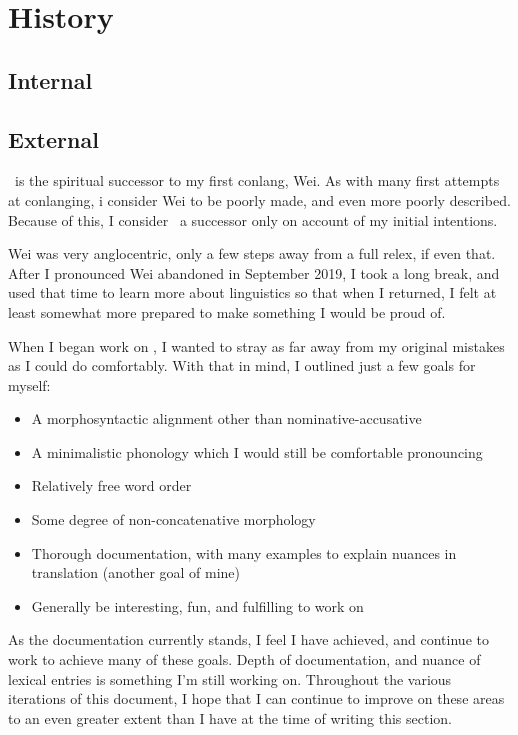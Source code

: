 \section{History}
\subsection{Internal}

\subsection{External}
\langname\ is the spiritual successor to my first conlang, Wei. As with many first attempts at conlanging, i consider Wei to be poorly made, and even more poorly described. Because of this, I consider \langname\ a successor only on account of my initial intentions.

Wei was very anglocentric, only a few steps away from a full relex, if even that. After I pronounced Wei abandoned in September 2019, I took a long break, and used that time to learn more about linguistics so that when I returned, I felt at least somewhat more prepared to make something I would be proud of.

When I began work on \langname , I wanted to stray as far away from my original mistakes as I could do comfortably. With that in mind, I outlined just a few goals for myself:

\begin{itemize}
  \item A morphosyntactic alignment other than nominative-accusative
  \item A minimalistic phonology which I would still be comfortable pronouncing
  \item Relatively free word order
  \item Some degree of non-concatenative morphology
  \item Thorough documentation, with many examples to explain nuances in translation (another goal of mine)
  \item Generally be interesting, fun, and fulfilling to work on
\end{itemize}

As the documentation currently stands, I feel I have achieved, and continue to work to achieve many of these goals. Depth of documentation, and nuance of lexical entries is something I'm still working on. Throughout the various iterations of this document, I hope that I can continue to improve on these areas to an even greater extent than I have at the time of writing this section.\footnotemark


